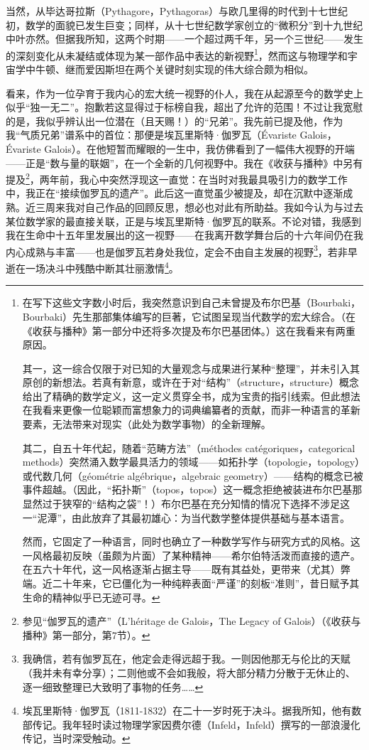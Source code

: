 当然，从毕达哥拉斯（Pythagore，Pythagoras）与欧几里得的时代到十七世纪初，数学的面貌已发生巨变；同样，从十七世纪数学家创立的“微积分”到十九世纪中叶亦然。但据我所知，这两个时期——一个超过两千年，另一个三世纪——发生的深刻变化从未凝结或体现为某一部作品中表达的新视野\footnote{在写下这些文字数小时后，我突然意识到自己未曾提及布尔巴基（Bourbaki，Bourbaki）先生那部集体编写的巨著，它试图呈现当代数学的宏大综合。（在《收获与播种》第一部分中还将多次提及布尔巴基团体。）这在我看来有两重原因。

其一，这一综合仅限于对已知的大量观念与成果进行某种“整理”，并未引入其原创的新想法。若真有新意，或许在于对“结构”（structure，structure）概念给出了精确的数学定义，这一定义贯穿全书，成为宝贵的指引线索。但此想法在我看来更像一位聪颖而富想象力的词典编纂者的贡献，而非一种语言的革新要素，无法带来对现实（此处为数学事物）的全新理解。

其二，自五十年代起，随着“范畴方法”（méthodes catégoriques，categorical methods）突然涌入数学最具活力的领域——如拓扑学（topologie，topology）或代数几何（géométrie algébrique，algebraic geometry）——结构的概念已被事件超越。（因此，“拓扑斯”（topos，topos）这一概念拒绝被装进布尔巴基那显然过于狭窄的“结构之袋”！）布尔巴基在充分知情的情况下选择不涉足这一“泥潭”，由此放弃了其最初雄心：为当代数学整体提供基础与基本语言。

然而，它固定了一种语言，同时也确立了一种数学写作与研究方式的风格。这一风格最初反映（虽颇为片面）了某种精神——希尔伯特活泼而直接的遗产。在五六十年代，这一风格逐渐占据主导——既有其益处，更带来（尤其）弊端。近二十年来，它已僵化为一种纯粹表面“严谨”的刻板“准则”，昔日赋予其生命的精神似乎已无迹可寻。}，然而这与物理学和宇宙学中牛顿、继而爱因斯坦在两个关键时刻实现的伟大综合颇为相似。

看来，作为一位孕育于我内心的宏大统一视野的仆人，我在从起源至今的数学史上似乎“独一无二”。抱歉若这显得过于标榜自我，超出了允许的范围！不过让我宽慰的是，我似乎辨认出一位潜在（且天赐！）的“兄弟”。我先前已提及他，作为我“气质兄弟”谱系中的首位：那便是埃瓦里斯特·伽罗瓦（Évariste Galois，Évariste Galois）。在他短暂而耀眼的一生中，我仿佛看到了一幅伟大视野的开端——正是“数与量的联姻”，在一个全新的几何视野中。我在《收获与播种》中另有提及\footnote{参见“伽罗瓦的遗产”（L'héritage de Galois，The Legacy of Galois）（《收获与播种》第一部分，第7节）。}，两年前，我心中突然浮现这一直觉：在当时对我最具吸引力的数学工作中，我正在“接续伽罗瓦的遗产”。此后这一直觉虽少被提及，却在沉默中逐渐成熟。近三周来我对自己作品的回顾反思，想必也对此有所助益。我如今认为与过去某位数学家的最直接关联，正是与埃瓦里斯特·伽罗瓦的联系。不论对错，我感到我在生命中十五年里发展出的这一视野——在我离开数学舞台后的十六年间仍在我内心成熟与丰富——也是伽罗瓦若身处我位，定会不由自主发展的视野\footnote{我确信，若有伽罗瓦在，他定会走得远超于我。一则因他那无与伦比的天赋（我并未有幸分享）；二则他或不会如我般，将大部分精力分散于无休止的、逐一细致整理已大致明了事物的任务……}，若非早逝在一场决斗中残酷中断其壮丽激情\footnote{埃瓦里斯特·伽罗瓦（1811-1832）在二十一岁时死于决斗。据我所知，他有数部传记。我年轻时读过物理学家因费尔德（Infeld，Infeld）撰写的一部浪漫化传记，当时深受触动。}。

